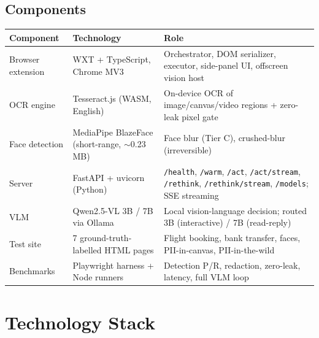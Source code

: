 \documentclass[11pt,a4paper]{article}
\newcommand{\code}[1]{\texttt{#1}}
\renewcommand{\arraystretch}{1.25}
\begin{document}
\begin{itemize}
\subsection{Components}

\begin{table}[H]
\small
\renewcommand{\arraystretch}{1.3}
\begin{tabularx}{\linewidth}{@{}lXX@{}}
\toprule
\textbf{Component} & \textbf{Technology} & \textbf{Role} \\
\midrule
Browser extension & WXT + TypeScript, Chrome MV3 & Orchestrator, DOM serializer, executor, side-panel UI, offscreen vision host \\
\midrule
OCR engine & Tesseract.js (WASM, English) & On-device OCR of image/canvas/video regions + zero-leak pixel gate \\
\midrule
Face detection & MediaPipe BlazeFace (short-range, $\sim$0.23 MB) & Face blur (Tier C), crushed-blur (irreversible) \\
\midrule
Server & FastAPI + uvicorn (Python) & \code{/health}, \code{/warm}, \code{/act}, \code{/act/stream}, \code{/rethink}, \code{/rethink/stream}, \code{/models}; SSE streaming \\
\midrule
VLM & Qwen2.5-VL 3B / 7B via Ollama & Local vision-language decision; routed 3B (interactive) / 7B (read-reply) \\
\midrule
Test site & 7 ground-truth-labelled HTML pages & Flight booking, bank transfer, faces, PII-in-canvas, PII-in-the-wild \\
\midrule
Benchmarks & Playwright harness + Node runners & Detection P/R, redaction, zero-leak, latency, full VLM loop \\
\bottomrule
\end{tabularx}
\end{table}

\section{Technology Stack}


\end{itemize}
\end{document}
